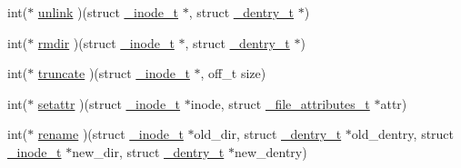 \begin{DoxyCompactItemize}
\item 
int($\ast$ \hyperlink{struct__fs__instance__t_a38cfd710b2d88ebb388059e90a406db6}{unlink} )(struct \hyperlink{struct__inode__t}{\-\_\-inode\-\_\-t} $\ast$, struct \hyperlink{struct__dentry__t}{\-\_\-dentry\-\_\-t} $\ast$)
\item 
int($\ast$ \hyperlink{struct__fs__instance__t_a4ceb71ff00d0a5fda03aa644c4694bef}{rmdir} )(struct \hyperlink{struct__inode__t}{\-\_\-inode\-\_\-t} $\ast$, struct \hyperlink{struct__dentry__t}{\-\_\-dentry\-\_\-t} $\ast$)
\item 
int($\ast$ \hyperlink{struct__fs__instance__t_a02c8b56a14997bf58d8350a26e441954}{truncate} )(struct \hyperlink{struct__inode__t}{\-\_\-inode\-\_\-t} $\ast$, off\-\_\-t size)
\item 
int($\ast$ \hyperlink{struct__fs__instance__t_ae76a7f1f9c4653baa497343bf26918a6}{setattr} )(struct \hyperlink{struct__inode__t}{\-\_\-inode\-\_\-t} $\ast$inode, struct \hyperlink{struct__file__attributes__t}{\-\_\-file\-\_\-attributes\-\_\-t} $\ast$attr)
\item 
int($\ast$ \hyperlink{struct__fs__instance__t_a62e37513c47dda9d11e534cf84d6f48b}{rename} )(struct \hyperlink{struct__inode__t}{\-\_\-inode\-\_\-t} $\ast$old\-\_\-dir, struct \hyperlink{struct__dentry__t}{\-\_\-dentry\-\_\-t} $\ast$old\-\_\-dentry, struct \hyperlink{struct__inode__t}{\-\_\-inode\-\_\-t} $\ast$new\-\_\-dir, struct \hyperlink{struct__dentry__t}{\-\_\-dentry\-\_\-t} $\ast$new\-\_\-dentry)
\end{DoxyCompactItemize}



